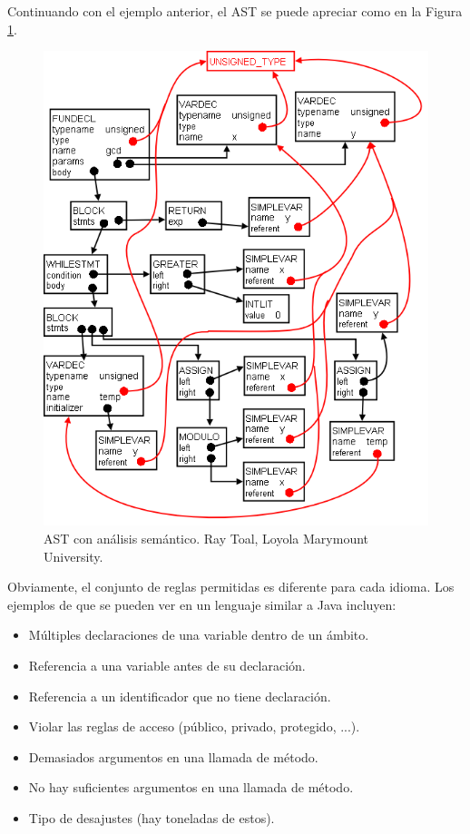 Continuando con el ejemplo anterior, el AST se puede apreciar como en la Figura \ref{fig:ast semantic}.\\

\begin{figure}[ht]
    \centering
    \includegraphics[scale=0.3]{images/gcdsemgraph.png}
    \caption{AST con análisis semántico. Ray Toal, Loyola Marymount University.}
    \label{fig:ast semantic}
\end{figure}

Obviamente, el conjunto de reglas permitidas es diferente para cada idioma. Los ejemplos de que se pueden ver en un lenguaje similar a Java incluyen:
\begin{itemize}
    \item Múltiples declaraciones de una variable dentro de un ámbito.
    \item Referencia a una variable antes de su declaración.
    \item Referencia a un identificador que no tiene declaración.
    \item Violar las reglas de acceso (público, privado, protegido, ...).
    \item Demasiados argumentos en una llamada de método.
    \item No hay suficientes argumentos en una llamada de método.
    \item Tipo de desajustes (hay toneladas de estos).
\end{itemize}

